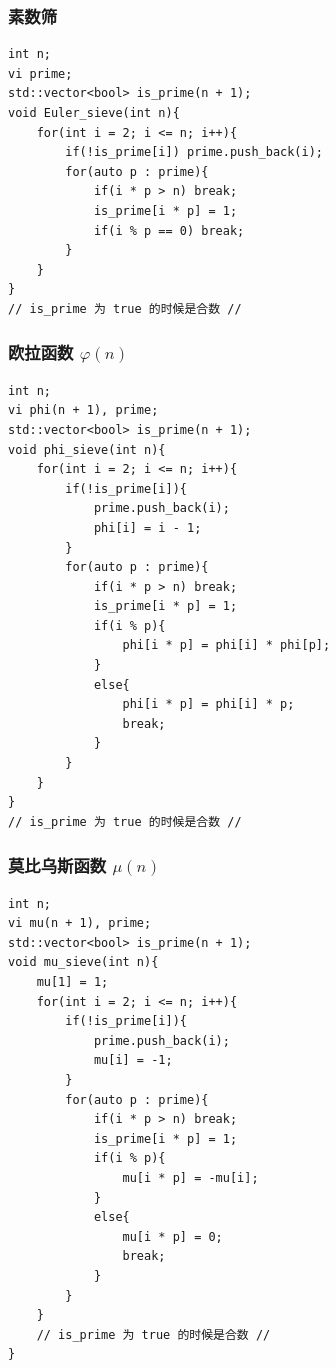 \documentclass[UTF8, a4paper, titlepage, twoside]{ctexart}
\begin{document}
\subsubsection{ 素数筛 }
\begin{lstlisting}
int n;
vi prime;
std::vector<bool> is_prime(n + 1);
void Euler_sieve(int n){
    for(int i = 2; i <= n; i++){
        if(!is_prime[i]) prime.push_back(i);
        for(auto p : prime){
            if(i * p > n) break;
            is_prime[i * p] = 1;
            if(i % p == 0) break;
        }
    }
}
// is_prime 为 true 的时候是合数 //
\end{lstlisting}

\subsubsection{ 欧拉函数 $\varphi(n)$ }
\begin{lstlisting}
int n;
vi phi(n + 1), prime;
std::vector<bool> is_prime(n + 1);
void phi_sieve(int n){
    for(int i = 2; i <= n; i++){
        if(!is_prime[i]){
            prime.push_back(i);
            phi[i] = i - 1;
        }
        for(auto p : prime){
            if(i * p > n) break;
            is_prime[i * p] = 1;
            if(i % p){
                phi[i * p] = phi[i] * phi[p];
            }
            else{
                phi[i * p] = phi[i] * p;
                break;
            }
        }
    }
}
// is_prime 为 true 的时候是合数 //
\end{lstlisting}

\subsubsection{ 莫比乌斯函数 $\mu(n)$ }
\begin{lstlisting}
int n;
vi mu(n + 1), prime;
std::vector<bool> is_prime(n + 1);
void mu_sieve(int n){
    mu[1] = 1;
    for(int i = 2; i <= n; i++){
        if(!is_prime[i]){
            prime.push_back(i);
            mu[i] = -1;
        }
        for(auto p : prime){
            if(i * p > n) break;
            is_prime[i * p] = 1;
            if(i % p){
                mu[i * p] = -mu[i];
            }
            else{
                mu[i * p] = 0;
                break;
            }
        }
    }
    // is_prime 为 true 的时候是合数 //
}

\end{lstlisting}
\end{document}
